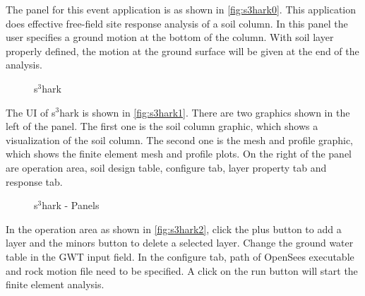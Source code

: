 The panel for this event application is as shown in \autoref{fig:s3hark0}. 
This application does effective free-field site response analysis of a soil column.
In this panel the user specifies a ground motion at the bottom of the column. 
With soil layer properly defined, the motion at the ground surface will be given at the end of the analysis.
\begin{figure}[!htbp]
  \caption{s$^3$hark}
  \label{fig:s3hark0}
\end{figure}

The UI of s$^3$hark is shown in \autoref{fig:s3hark1}.
There are two graphics shown in the left of the panel. The first one is the soil column graphic, 
which shows a visualization of the soil column.
The second one is the mesh and profile graphic, 
which shows the finite element mesh and profile plots.
On the right of the panel are operation area, soil design table, configure tab, layer property tab and response tab. 


\begin{figure}[!htbp]
  \caption{s$^3$hark - Panels}
  \label{fig:s3hark1}
\end{figure}

In the operation area as shown in \autoref{fig:s3hark2}, click the plus button to add a layer and the minors button to delete a selected layer. 
Change the ground water table in the GWT input field. 
In the configure tab, path of OpenSees executable and rock motion file need to be specified.
A click on the run button will start the finite element analysis.


